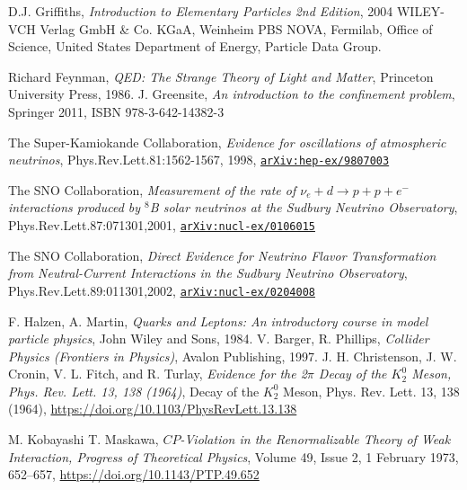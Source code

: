 \documentclass[11pt,a4paper,openright,twoside]{report}
\newcommand{\bibref}[4]{#1, \textit{#2}, #3 #4}
\begin{document}
\begin{thebibliography}{9}
	\bibref{D.J. Griffiths}{Introduction to Elementary Particles 2nd Edition}{2004 WILEY-VCH Verlag GmbH \& Co. KGaA, Weinheim}

	PBS NOVA, Fermilab, Office of Science, United States Department of Energy, Particle Data Group.
	
	\bibref{Richard Feynman}{QED: The Strange Theory of Light and Matter}{Princeton University Press, 1986.}
	
	\bibref{J. Greensite}{An introduction to the confinement problem}{Springer 2011,}{ISBN 978-3-642-14382-3}
	
	\bibref{The Super-Kamiokande Collaboration}{Evidence for oscillations of atmospheric neutrinos}{Phys.Rev.Lett.81:1562-1567, 1998,}{\href{https://arxiv.org/abs/hep-ex/9807003}{\texttt{arXiv:hep-ex/9807003}}}
	
	\bibref{The SNO Collaboration}{Measurement of the rate of $\nu_e + d \to p + p + e^-$ interactions produced by ${}^8$B solar neutrinos at the Sudbury Neutrino Observatory}{Phys.Rev.Lett.87:071301,2001,}{\href{https://arxiv.org/abs/nucl-ex/0106015}{\texttt{arXiv:nucl-ex/0106015}}}
	
	\bibref{The SNO Collaboration}{Direct Evidence for Neutrino Flavor Transformation from Neutral-Current Interactions in the Sudbury Neutrino Observatory}{Phys.Rev.Lett.89:011301,2002,}{\href{https://arxiv.org/abs/nucl-ex/0204008}{\texttt{arXiv:nucl-ex/0204008}}}
	
	\bibref{F. Halzen, A. Martin}{Quarks and Leptons: An introductory course in model particle physics}{John Wiley and Sons, 1984.}

	\bibref{V. Barger, R. Phillips}{Collider Physics (Frontiers in Physics)}{Avalon Publishing, 1997.}

	\bibref{J. H. Christenson, J. W. Cronin, V. L. Fitch, and R. Turlay}{Evidence for the 2$\pi$ Decay of the $K_2^0$ Meson, Phys. Rev. Lett. 13, 138 (1964)}{Decay of the $K_2^0$ Meson, Phys. Rev. Lett. 13, 138 (1964),}{\url{https://doi.org/10.1103/PhysRevLett.13.138}}

	\bibref{M. Kobayashi T. Maskawa}{$CP$-Violation in the Renormalizable Theory of Weak Interaction, Progress of Theoretical Physics}{Volume 49, Issue 2, 1 February 1973, 652–657,}{\url{https://doi.org/10.1143/PTP.49.652}}


\end{thebibliography}
\end{document}
